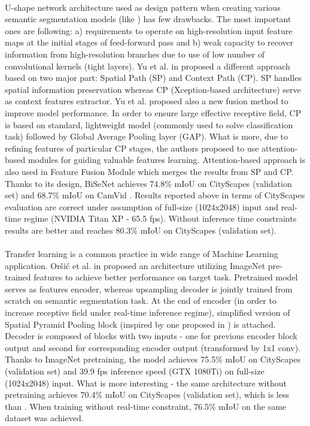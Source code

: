 \documentclass{article}
\begin{document}
\paragraph{}
U-shape network architecture used as design pattern when creating various semantic segmentation models (like \cite{icnet}) has few drawbacks. The most important ones are following: a) requirements to operate on high-resolution input feature maps at the initial stages of feed-forward pass and b) weak capacity to recover information from high-resolution branches due to use of low number of convolutional kernels (tight layers). Yu et al. in \cite{bisnet} proposed a different approach based on two major part: Spatial Path (SP) and Context Path (CP). SP handles spatial information preservation whereas CP (Xception-based \cite{xception} architecture) serve as context features extractor. Yu et al. proposed also a new fusion method to improve model performance. In order to ensure large effective receptive field, CP is based on standard, lightweight model (commonly used to solve classification task) followed by Global Average Pooling layer (GAP). What is more, due to refining features of particular CP stages, the authors proposed to use attention-based modules for guiding valuable features learning. Attention-based approach is also used in Feature Fusion Module which merges the results from SP and CP. Thanks to its design, BiSeNet achieves 74.8\% mIoU on CityScapes \cite{cityscapes} (validation set) and 68.7\% mIoU on CamVid \cite{camvid}. Results reported above in terms of CityScapes \cite{cityscapes} evaluation are correct under assumption of full-size (1024x2048) input and real-time regime (NVIDIA Titan XP - 65.5 fps). Without inference time constraints results are better and reaches 80.3\% mIoU on CityScapes \cite{cityscapes} (validation set).

\paragraph{}
Transfer learning is a common practice in wide range of Machine Learning application. Oršić et al. in \cite{swift_net} proposed an architecture utilizing ImageNet pre-trained features to achieve better performance on target task. Pretrained model serves as features encoder, whereas upsampling decoder is jointly trained from scratch on semantic segmentation task. At the end of encoder (in order to increase receptive field under real-time inference regime), simplified version of Spatial Pyramid Pooling block (inspired by one proposed in \cite{psp}) is attached. Decoder is composed of blocks with two inputs - one for previous encoder block output and second for corresponding encoder output (transformed by 1x1 conv). Thanks to ImageNet pretraining, the model achieves 75.5\% mIoU on CityScapes \cite{cityscapes} (validation set) and 39.9 fps inference speed (GTX 1080Ti) on full-size (1024x2048) input. What is more interesting - the same architecture without pretraining achieves  70.4\% mIoU on CityScapes (validation set), which is less than \cite{icnet}. When training without real-time constraint, 76.5\% mIoU on the same dataset was achieved.
\end{document}
